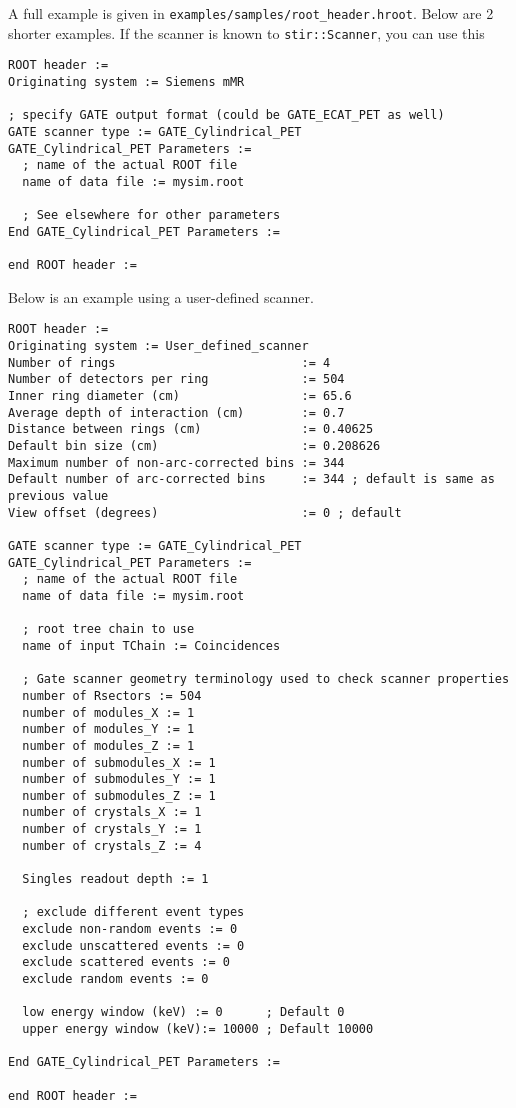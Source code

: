 \documentclass{article}
\begin{document}
A full example is given in \texttt{examples/samples/root\_header.hroot}. Below are
2 shorter examples.
If the scanner is known to \texttt{stir::Scanner}, you can use this
\begin{verbatim}
ROOT header := 
Originating system := Siemens mMR

; specify GATE output format (could be GATE_ECAT_PET as well)
GATE scanner type := GATE_Cylindrical_PET
GATE_Cylindrical_PET Parameters :=
  ; name of the actual ROOT file
  name of data file := mysim.root

  ; See elsewhere for other parameters
End GATE_Cylindrical_PET Parameters :=

end ROOT header := 
\end{verbatim}
Below is an example using a user-defined scanner. 
\begin{verbatim}
ROOT header := 
Originating system := User_defined_scanner
Number of rings                          := 4
Number of detectors per ring             := 504
Inner ring diameter (cm)                 := 65.6
Average depth of interaction (cm)        := 0.7
Distance between rings (cm)              := 0.40625
Default bin size (cm)                    := 0.208626
Maximum number of non-arc-corrected bins := 344
Default number of arc-corrected bins     := 344 ; default is same as previous value
View offset (degrees)                    := 0 ; default

GATE scanner type := GATE_Cylindrical_PET
GATE_Cylindrical_PET Parameters :=
  ; name of the actual ROOT file
  name of data file := mysim.root

  ; root tree chain to use
  name of input TChain := Coincidences

  ; Gate scanner geometry terminology used to check scanner properties
  number of Rsectors := 504 
  number of modules_X := 1 
  number of modules_Y := 1
  number of modules_Z := 1
  number of submodules_X := 1
  number of submodules_Y := 1
  number of submodules_Z := 1
  number of crystals_X := 1
  number of crystals_Y := 1
  number of crystals_Z := 4

  Singles readout depth := 1

  ; exclude different event types
  exclude non-random events := 0
  exclude unscattered events := 0
  exclude scattered events := 0
  exclude random events := 0

  low energy window (keV) := 0      ; Default 0
  upper energy window (keV):= 10000 ; Default 10000

End GATE_Cylindrical_PET Parameters :=

end ROOT header := 
\end{verbatim}
\end{document}
